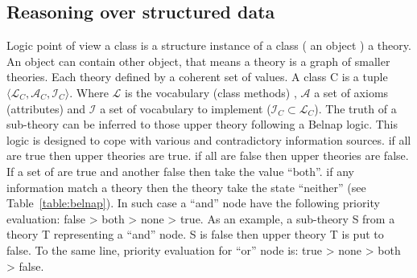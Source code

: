 \documentclass{llncs}
\begin{document}
\subsection{Reasoning over structured data}
 Logic point of view \added{,} a class is a structure  instance of a class ( an object ) a theory. An object can  contain other object, that means a theory is a graph of smaller theories. Each theory  defined by a coherent set of values. A class C is a tuple \( \langle \mathcal{L}_{C}, \mathcal{A}_{C} , \mathcal{I}_{C} \rangle \). Where  \(\mathcal{L} \) is the vocabulary (class methods) ,  \(\mathcal{A} \)  a set of axioms (attributes) and \(\mathcal{I} \) a set of vocabulary to implement (\( \mathcal{I}_{C} \subset\mathcal{L}_{C} \)). The truth of a sub-theory can be inferred to those upper theory following a Belnap logic. This logic is designed to cope with various and contradictory information sources.  if all  are true then upper theories are true. if all  are false then upper theories are false. If a set of  are true and another false then  take the value ``both''.  if any information match a theory then the theory take the state ``neither'' (see Table~\ref{table:belnap}). In such case a ``and'' node have the following priority evaluation: false > both > none > true. As an example, a sub-theory S from a theory T representing a  ``and'' node. S is false then upper theory T is put to false. To the same line, priority evaluation for ``or'' node is: true > none > both > false.
    
\end{document}
